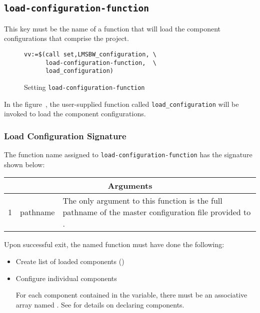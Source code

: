 \subsection{\texttt{load-configuration-function}}\label{variables:load-configuration-function}

This key must be the name of a \gnumake function that will load the
component configurations that comprise the project.

\begin{figure}
\hrulefill
\begin{verbatim}
vv:=$(call set,LMSBW_configuration, \
      load-configuration-function,  \
      load_configuration)
\end{verbatim}
\hrulefill
\caption{Setting \texttt{load-configuration-function}}\label{variables:set-load-configuration}
\end{figure}

In the figure~, the
user-supplied function called \texttt{load\_configuration} will be
invoked to load the component configurations.

\subsubsection{Load Configuration Signature}

The function name assigned to \texttt{load-configuration-function} has
the signature shown below:

\begin{tabularx}{\linewidth}{ll|X}
  \multicolumn{3}{c}{\textbf{Arguments}} \\ \hline
  1 & pathname &   The only  argument to this function is the full pathname of the
  master configuration file provided to \lmsbw. \\
\end{tabularx}


Upon successful exit, the named function must have done the following:

\begin{itemize}
\item Create list of loaded components
  ()

\item Configure individual components

  For each component contained in the \lmsbwcomponents variable, there
  must be an associative array named .
  See \xref{chap:wrapping} for details on declaring components.

\end{itemize}



